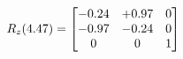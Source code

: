 \documentclass[preview]{standalone}
\begin{document}
\begin{align*}
\special{dvisvgm:raw <g id='unique000'>}R_{z}(4.47) = \begin{bmatrix}-0.24 & +0.97 & 0 \\-0.97 & -0.24 & 0 \\0 & 0 & 1\end{bmatrix}\special{dvisvgm:raw </g>}
\end{align*}
\end{document}
